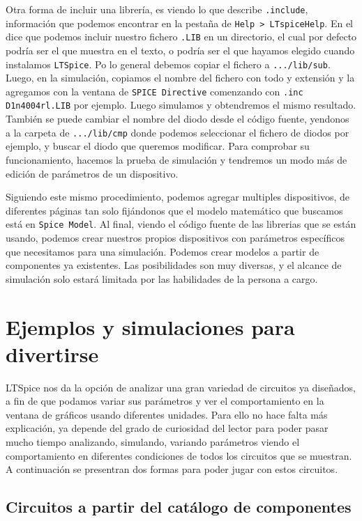 \documentclass[a4paper]{article} %
\begin{document}
Otra forma de incluir una librería, es viendo lo que describe \texttt{.include}, información que podemos encontrar en la pestaña de \texttt{Help > LTspiceHelp}. En el dice que podemos incluir nuestro fichero \texttt{.LIB} en un directorio, el cual por defecto podría ser el que muestra en el texto, o podría ser el que hayamos elegido cuando instalamos \texttt{LTSpice}. Po lo general debemos copiar el fichero a \texttt{.../lib/sub}. Luego, en la simulación, copiamos el nombre del fichero con todo y extensión y la agregamos con la ventana de \texttt{SPICE Directive} comenzando con \texttt{.inc D1n4004rl.LIB} por ejemplo. Luego simulamos y obtendremos el mismo resultado. También se puede cambiar el nombre del diodo desde el código fuente, yendonos a la carpeta de \texttt{.../lib/cmp} donde podemos seleccionar el fichero de diodos por ejemplo, y buscar el diodo que queremos modificar. Para comprobar su funcionamiento, hacemos la prueba de simulación y tendremos un modo más de edición de parámetros de un dispositivo.

Siguiendo este mismo procedimiento, podemos agregar multiples dispositivos, de diferentes páginas tan solo fijándonos que el modelo matemático que buscamos está en \texttt{Spice Model}. Al final, viendo el código fuente de las librerias que se están usando, podemos crear nuestros propios dispositivos con parámetros específicos que necesitamos para una simulación. Podemos crear modelos a partir de componentes ya existentes. Las posibilidades son muy diversas, y el alcance de simulación solo estará limitada por las habilidades de la persona a cargo.

\section{Ejemplos y simulaciones para divertirse}

LTSpice nos da la opción de analizar una gran variedad de circuitos ya diseñados, a fin de que podamos variar sus parámetros y ver el comportamiento en la ventana de gráficos usando diferentes unidades. Para ello no hace falta más explicación, ya depende del grado de curiosidad del lector para poder pasar mucho tiempo analizando, simulando, variando parámetros viendo el comportamiento en diferentes condiciones de todos los circuitos que se muestran. A continuación se presentran dos formas para poder jugar con estos circuitos.

\subsection{Circuitos a partir del catálogo de componentes}
\end{document}
